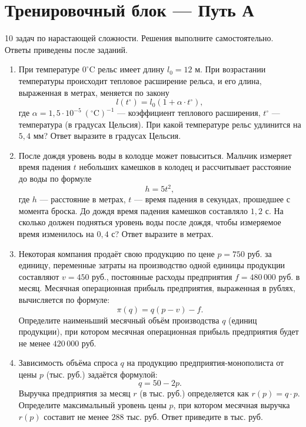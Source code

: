 \documentclass[a4paper,12pt]{article}
\newcommand{\smallnote}[1]{{\small\textcolor{muted}{#1}}}
\begin{document}
\section*{Тренировочный блок --- Путь А}
\smallnote{10 задач по нарастающей сложности. Решения выполните самостоятельно. Ответы приведены после заданий.}
\vspace{4mm}
\begin{enumerate}[label=\textcolor{accent}{\textbf{\arabic*.}},leftmargin=*,itemsep=13pt,parsep=4pt]
\item При температуре $0^\circ\mathrm{C}$ рельс имеет длину $l_0=12$ м. При возрастании температуры происходит тепловое расширение рельса, и его длина, выраженная в метрах, меняется по закону
\[
 l(t^\circ)=l_0(1+\alpha\cdot t^\circ),
\]
где $\alpha=1{,}5\cdot10^{-5}\ ({}^\circ\mathrm{C})^{-1}$ --- коэффициент теплового расширения, $t^\circ$ --- температура (в градусах Цельсия). При какой температуре рельс удлинится на $5{,}4$ мм? Ответ выразите в градусах Цельсия.

\item После дождя уровень воды в колодце может повыситься. Мальчик измеряет время падения $t$ небольших камешков в колодец и рассчитывает расстояние до воды по формуле
\[
 h=5t^2,
\]
где $h$ --- расстояние в метрах, $t$ --- время падения в секундах, прошедшее с момента броска. До дождя время падения камешков составляло $1{,}2$ с. На сколько должен подняться уровень воды после дождя, чтобы измеряемое время изменилось на $0{,}4$ с? Ответ выразите в метрах.

\item Некоторая компания продаёт свою продукцию по цене $p=750$ руб. за единицу, переменные затраты на производство одной единицы продукции составляют $v=450$ руб., постоянные расходы предприятия $f=480\,000$ руб. в месяц. Месячная операционная прибыль предприятия, выраженная в рублях, вычисляется по формуле:
\[
 \pi(q)=q(p-v)-f.
\]
Определите наименьший месячный объём производства $q$ (единиц продукции), при котором месячная операционная прибыль предприятия будет не менее $420\,000$ руб.

\item Зависимость объёма спроса $q$ на продукцию предприятия-монополиста от цены $p$ (тыс. руб.) задаётся формулой:
\[
 q=50-2p.
\]
Выручка предприятия за месяц $r$ (в тыс. руб.) определяется как $r(p)=q\cdot p$. Определите максимальный уровень цены $p$, при котором месячная выручка $r(p)$ составит не менее $288$ тыс. руб. Ответ приведите в тыс. руб.


\end{enumerate}
\end{document}
